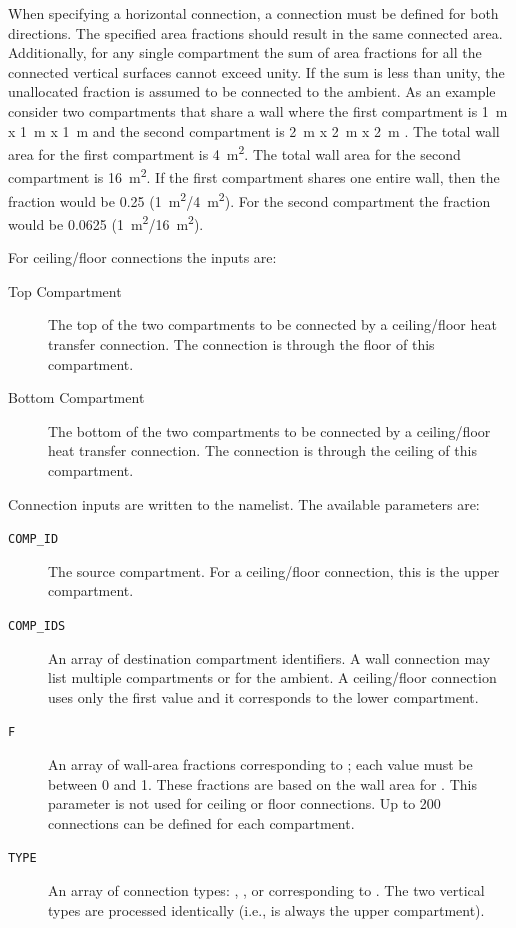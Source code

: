 {{When specifying a horizontal connection, a connection must be defined for both directions. The specified area fractions should result in the same connected area. Additionally, for any single compartment the sum of area fractions for all the connected vertical surfaces cannot exceed unity. If the sum is less than unity, the unallocated fraction is assumed to be connected to the ambient. As an example consider two compartments that share a wall where the first compartment is 1~\unit{m} x 1~\unit{m} x 1~\unit{m}  and the second compartment is 2~\unit{m} x 2~\unit{m}  x 2~\unit{m} . The total wall area for the first compartment is 4~\unit{m^2}. The total wall area for the second compartment is 16~\unit{m^2}. If the first compartment shares one entire wall, then the fraction would be 0.25 (1~\unit{m^2}/4~\unit{m^2}).  For the second compartment the fraction would be 0.0625 (1~\unit{m^2}/16~\unit{m^2}).

For ceiling/floor connections the inputs are:

\begin{description}
    \item[Top Compartment] The top of the two compartments to be connected by a ceiling/floor heat transfer connection. The connection is through the floor of this compartment.

    \item[Bottom Compartment] The bottom of the two compartments to be connected by a ceiling/floor heat transfer connection. The connection is through the ceiling of this compartment.
\end{description}

Connection inputs are written to the  namelist. The available parameters are:

\begin{description}
\item[\texttt{COMP\_ID}] The source compartment. For a ceiling/floor connection, this is the upper compartment.
\item[\texttt{COMP\_IDS}] An array of destination compartment identifiers. A wall connection may list multiple compartments or  for the ambient. A ceiling/floor connection uses only the first value and it corresponds to the lower compartment.
\item[\texttt{F}] An array of wall-area fractions corresponding to ; each value must be between 0 and 1. These fractions are based on the wall area for . This parameter is not used for ceiling or floor connections. Up to 200 connections can be defined for each compartment.
\item[\texttt{TYPE}] An array of connection types: , , or  corresponding to . The two vertical types are processed identically (i.e.,  is always the upper compartment).
\end{description}


}}
